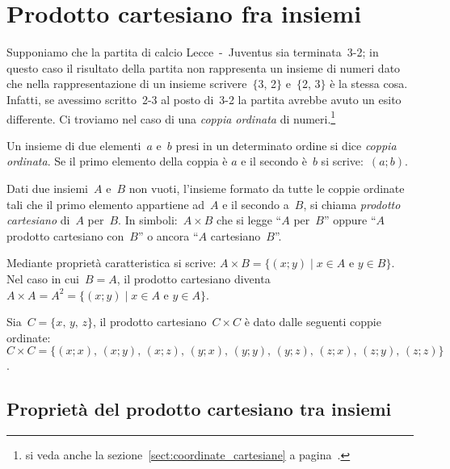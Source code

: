 \ovalbox{\risolvii \ref{ese:7.28}, \ref{ese:7.29}, \ref{ese:7.30}, \ref{ese:7.31}}

\section{Prodotto cartesiano fra insiemi}

Supponiamo che la partita di calcio Lecce~-~Juventus sia terminata~3-2; in questo caso il risultato della partita
non rappresenta un insieme di numeri dato che nella rappresentazione di un insieme scrivere~$\{$3, 2$\}$ e~$\{$2, 3$\}$
 è la stessa cosa. Infatti, se avessimo scritto~2-3 al posto di~3-2 la partita avrebbe avuto un esito
differente. Ci troviamo nel caso di una \emph{coppia ordinata} di numeri.\footnote{si veda anche la sezione~\ref{sect:coordinate_cartesiane} a pagina~\pageref{sect:coordinate_cartesiane}.}

\begin{definizione}
Un insieme di due elementi~$a$ e~$b$
presi in un determinato ordine si dice \emph{coppia ordinata}. Se il primo elemento della coppia è
$a$ e il secondo è~$b$ si scrive:~$(a;b)$.
\end{definizione}

\begin{definizione}
Dati due insiemi~$A$ e~$B$ non vuoti,
l'insieme formato da tutte le coppie ordinate tali che
il primo elemento appartiene ad~$A$ e il secondo a~$B$, si chiama
\emph{prodotto cartesiano} di~$A$ per~$B$. In simboli:~$A\times B$ che si legge ``$A$ per~$B$''
oppure ``$A$ prodotto cartesiano con~$B$'' o ancora ``$A$ cartesiano~$B$''.
\end{definizione}

Mediante proprietà caratteristica si scrive:
$A\times B=\{(x;y)\mid x\in A\text{ e }y\in B\}$.
Nel caso in cui~$B=A$, il prodotto cartesiano diventa $A\times A=A^{2}=\{(x;y)\mid x\in A\text{ e }y\in A\}$.

\begin{exrig}
 \begin{esempio}
Sia~$C=\{x\text{, }y\text{, }z\}$, il prodotto cartesiano~$C\times C$ è dato dalle
seguenti coppie ordinate:~$C\times C=\{(x;x)\text{, }(x;y)\text{, }(x;z)\text{, }(y;x)\text{, }(y;y)\text{, }(y;z)\text{, }(z;x)\text{, }(z;y)\text{, }(z;z)\}$.
 \end{esempio}
\end{exrig}

\subsection{Proprietà del prodotto cartesiano tra insiemi}

